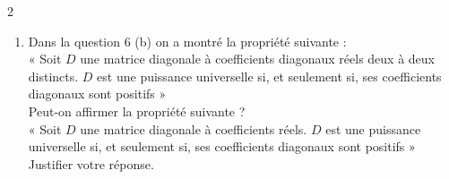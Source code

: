 \documentclass{article}
\begin{document}
\begin{paracol}{2}
{\begin{enumerate}
    \item Dans la question 6 (b) on a montré la propriété suivante :\\
    « Soit $D$ une matrice diagonale à coefficients diagonaux réels deux à deux distincts. $D$ est une puissance universelle si, et seulement si, ses coefficients diagonaux sont positifs »\\
    Peut-on affirmer la propriété suivante ?\\
    « Soit $D$ une matrice diagonale à coefficients réels. $D$ est une puissance universelle si, et seulement si, ses coefficients diagonaux sont positifs »\\
    Justifier votre réponse.
\end{enumerate}
}

\end{paracol}
\end{document}

